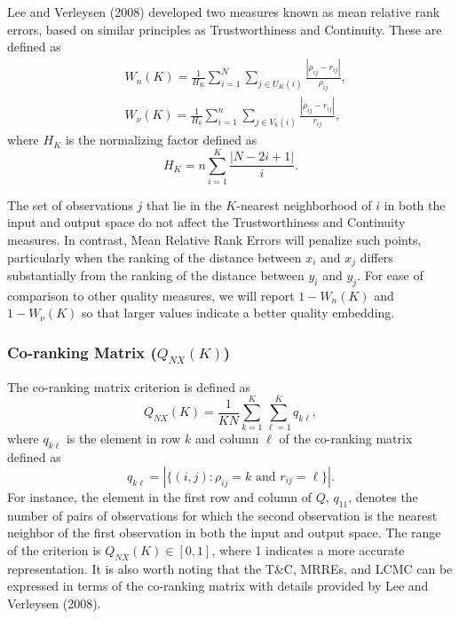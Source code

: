 \documentclass[12pt]{article}
\begin{document}
Lee and Verleysen (2008) developed two measures known as mean relative rank errors, based on similar principles as Trustworthiness and Continuity. These are defined as
\begin{equation}\label{eq:MRREs}
\begin{aligned}
  & W_{n}(K)=\frac{1}{H_{K}} \sum_{i=1}^{N} \sum_{j \in U_{K}(i)} \frac{|\rho_{ij}-r_{ij}|}{\rho_{ij}}, \\
  & W_{\nu}(K)=\frac{1}{H_{k}} \sum_{i=1}^{n} \sum_{j \in V_{k}(i)} \frac{|\rho_{ij}-r_{ij}|}{r_{ij}},
\end{aligned}
\end{equation}
where \(H_K\) is the normalizing factor defined as
\[
  H_{K}=n \sum_{i=1}^{K} \frac{|N-2 i+1|}{i}.
\]

The set of observations \(j\) that lie in the \(K\)-nearest neighborhood of \(i\) in both the input and output space do not affect the Trustworthiness and Continuity measures. In contrast, Mean Relative Rank Errors will penalize such points, particularly when the ranking of the distance between \(x_i\) and \(x_j\) differs substantially from the ranking of the distance between \(y_i\) and \(y_j\). For ease of comparison to other quality measures, we will report \(1-W_{n}(K)\) and \(1-W_{\nu}(K)\) so that larger values indicate a better quality embedding.

\hypertarget{co-ranking-matrix-q_nxk}{%
\subsubsection*{\texorpdfstring{Co-ranking Matrix (\(Q_{NX}(K)\))}{Co-ranking Matrix (Q\_\{NX\}(K))}}\label{co-ranking-matrix-q_nxk}}

The co-ranking matrix criterion is defined as
\begin{equation}\label{eq:Q_NX}
  Q_{NX}(K)=\frac{1}{K N} \sum_{k=1}^{K} \sum_{\ell=1}^{K} q_{k\ell},
\end{equation}
where \(q_{k\ell}\) is the element in row \(k\) and column \(\ell\) of the co-ranking matrix defined as
\begin{equation}\label{eq:coRanking}
  q_{k\ell}=|\{(i, j): \rho_{i j}=k \text { and } r_{i j}=\ell\}|.
\end{equation}
For instance, the element in the first row and column of \(Q\), \(q_{11}\), denotes the number of pairs of observations for which the second observation is the nearest neighbor of the first observation in both the input and output space. The range of the criterion is \(Q_{N X}(K) \in[0,1]\), where 1 indicates a more accurate representation. It is also worth noting that the T\&C, MRREs, and LCMC can be expressed in terms of the co-ranking matrix with details provided by Lee and Verleysen (2008).
\end{document}
